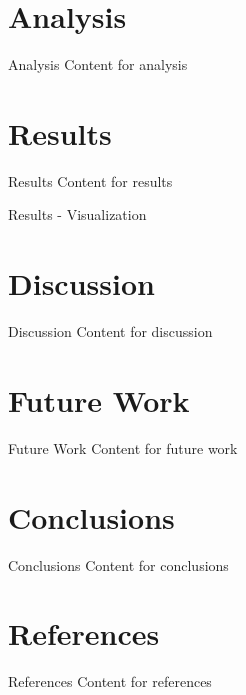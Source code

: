 \section{Analysis}
\begin{frame}{Analysis}
    Content for analysis
\end{frame}

\section{Results}
\begin{frame}{Results}
    Content for results
\end{frame}

\begin{frame}{Results - Visualization}
\end{frame}

\section{Discussion}
\begin{frame}{Discussion}
    Content for discussion
\end{frame}

\section{Future Work}
\begin{frame}{Future Work}
    Content for future work
\end{frame}

\section{Conclusions}
\begin{frame}{Conclusions}
    Content for conclusions
\end{frame}

\section{References}
\begin{frame}{References}
    Content for references
\end{frame}


